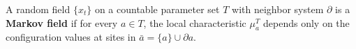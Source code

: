 A random field $\{x_t\}$ on a countable parameter set $T$ with neighbor system $\partial$ is a \textbf{Markov field} if for every $a \in T$, the local characteristic $\mu_a^T$ depends only on the configuration values at sites in $\bar{a} = \{a\} \cup \partial a$.
